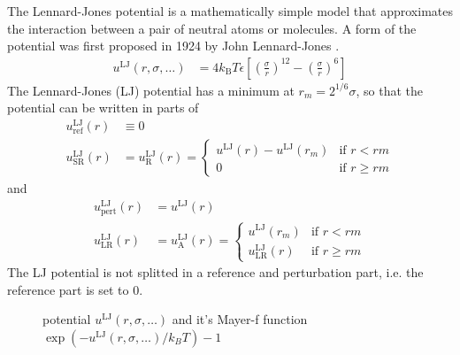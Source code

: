 The Lennard-Jones potential is a mathematically simple model that approximates the interaction
between a pair of neutral atoms or molecules.
A form of the potential was first proposed in 1924 by John Lennard-Jones \cite{Jones1924}.
\begin{align}
u^\text{LJ}(r,\sigma,\ldots) &= 4 k_\text{B}T \epsilon \left[ \left(\frac{\sigma}{r}\right)^{12} - \left(\frac{\sigma}{r}\right)^{6}\right]
\end{align}
The Lennard-Jones (LJ) potential has a minimum at $r_m=2^{1/6} \sigma$, so that the potential can be written in parts of
\begin{align}
u^\text{LJ}_\text{ref}(r) & \equiv 0 \\
u^\text{LJ}_\text{SR}(r)  & = u^\text{LJ}_\text{R}(r) =
\begin{cases}
u^\text{LJ}(r) - u^\text{LJ}(r_m)  & \mbox{if } r <    rm \\
0                                  & \mbox{if } r \geq rm
\end{cases}
\end{align}
and
\begin{align}
u^\text{LJ}_\text{pert}(r) &= u^\text{LJ}(r) \\
u^\text{LJ}_\text{LR}(r)   &= u^\text{LJ}_\text{A}(r) =
\begin{cases}
u^\text{LJ}(r_m)          & \mbox{if } r <    rm \\
u^\text{LJ}_\text{LR}(r)  & \mbox{if } r \geq rm
\end{cases}
\end{align}
The LJ potential is not splitted in a reference and perturbation part, i.e. the reference part is set to 0.

\begin{figure}[htb]
\centering
  \quad
  \caption{potential $u^\text{LJ}(r,\sigma,\ldots)$ and it's Mayer-f function $\exp(-u^\text{LJ}(r,\sigma,\ldots)/k_BT)-1$}
\end{figure}

